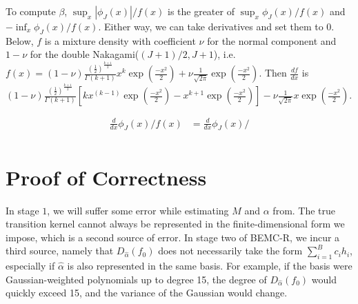 \documentclass{article}
\begin{document}
To compute $\beta$, $\sup_x |\phi_{J}(x)|/f(x)$ is the greater of $\sup_x \phi_{J}(x)/f(x)$ and $-\inf_x \phi_{J}(x)/f(x)$. Either way, we can take derivatives and set them to 0. Below, $f$ is a mixture density with coefficient $\nu$ for the normal component and $1-\nu$ for the double Nakagami($(J+1)/2, J+1$), i.e. $f(x) = (1-\nu)\frac{(\frac{1}{2})^{\frac{k+1}{2}}}{ \Gamma(k+1)} x^k\exp(\frac{-x^2}{2}) + \nu \frac{1}{\sqrt{2\pi}}\exp(\frac{-x^2}{2})$. Then $\frac{df}{dx}$ is $(1-\nu)\frac{(\frac{1}{2})^{\frac{k+1}{2}}}{ \Gamma(k+1)} \left[ kx^{(k-1)}\exp(\frac{-x^2}{2}) -x^{k+1}\exp(\frac{-x^2}{2})  \right] - \nu \frac{1}{\sqrt{2\pi}}x\exp(\frac{-x^2}{2})$.

\begin{align*}
\frac{d}{dx} \phi_{J}(x)/f(x)&=\frac{d}{dx}\phi_{J}(x)/\\
\end{align*}




 

\section{Proof of Correctness}
In stage $1$, we will suffer some error while estimating $M$ and $\alpha$ from. The true transition kernel cannot always be represented in the finite-dimensional form we impose, which is a second source of error. In stage two of BEMC-R, we incur a third source, namely that $D_{\hat{\alpha}}(f_0)$ does not necessarily take the form $\sum_{i=1}^B c_i h_i$, especially if $\hat{\alpha}$ is also represented in the same basis. For example, if the basis were Gaussian-weighted polynomials up to degree 15, the degree of $D_{\hat{\alpha}}(f_0)$ would quickly exceed 15, and the variance of the Gaussian would change. 



\end{document}
